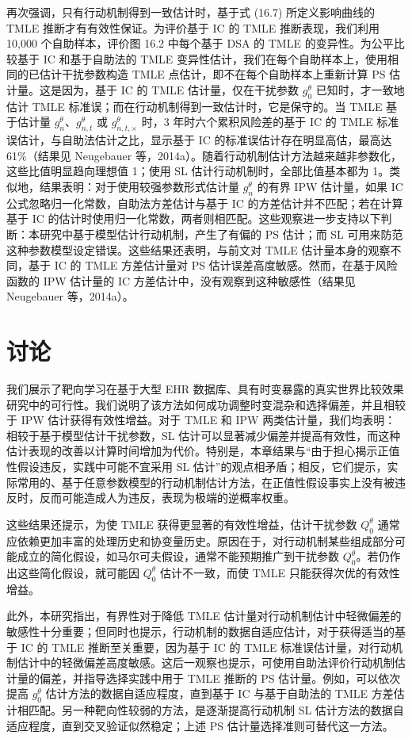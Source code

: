 再次强调，只有行动机制得到一致估计时，基于式 (16.7) 所定义影响曲线的 TMLE 推断才有有效性保证。为评价基于 IC 的 TMLE 推断表现，我们利用 10,000 个自助样本，评价图 16.2 中每个基于 DSA 的 TMLE 的变异性。为公平比较基于 IC 和基于自助法的 TMLE 变异性估计，我们在每个自助样本上，使用相同的已估计干扰参数构造 TMLE 点估计，即不在每个自助样本上重新计算 PS 估计量。这是因为，基于 IC 的 TMLE 估计量，仅在干扰参数 $g_0^\theta$ 已知时，才一致地估计 TMLE 标准误；而在行动机制得到一致估计时，它是保守的。当 TMLE 基于估计量 $g_n^\theta$、$g^\theta_{n,t}$ 或 $g^\theta_{n,t,\times}$ 时，3 年时六个累积风险差的基于 IC 的 TMLE 标准误估计，与自助法估计之比，显示基于 IC 的标准误估计存在明显高估，最高达 61\%（结果见 Neugebauer 等，2014a）。随着行动机制估计方法越来越非参数化，这些比值明显趋向理想值 1；使用 SL 估计行动机制时，全部比值基本都为 1。类似地，结果表明：对于使用较强参数形式估计量 $g_n^\theta$ 的有界 IPW 估计量，如果 IC 公式忽略归一化常数，自助法方差估计与基于 IC 的方差估计并不匹配；若在计算基于 IC 的估计时使用归一化常数，两者则相匹配。这些观察进一步支持以下判断：本研究中基于模型估计行动机制，产生了有偏的 PS 估计；而 SL 可用来防范这种参数模型设定错误。这些结果还表明，与前文对 TMLE 估计量本身的观察不同，基于 IC 的 TMLE 方差估计量对 PS 估计误差高度敏感。然而，在基于风险函数的 IPW 估计量的 IC 方差估计中，没有观察到这种敏感性（结果见 Neugebauer 等，2014a）。

\section{讨论}

我们展示了靶向学习在基于大型 EHR 数据库、具有时变暴露的真实世界比较效果研究中的可行性。我们说明了该方法如何成功调整时变混杂和选择偏差，并且相较于 IPW 估计获得有效性增益。对于 TMLE 和 IPW 两类估计量，我们均表明：相较于基于模型估计干扰参数，SL 估计可以显著减少偏差并提高有效性，而这种估计表现的改善以计算时间增加为代价。特别是，本章结果与“由于担心揭示正值性假设违反，实践中可能不宜采用 SL 估计”的观点相矛盾；相反，它们提示，实际常用的、基于任意参数模型的行动机制估计方法，在正值性假设事实上没有被违反时，反而可能造成人为违反，表现为极端的逆概率权重。

这些结果还提示，为使 TMLE 获得更显著的有效性增益，估计干扰参数 $Q_0^\theta$ 通常应依赖更加丰富的处理历史和协变量历史。原因在于，对行动机制某些组成部分可能成立的简化假设，如马尔可夫假设，通常不能预期推广到干扰参数 $Q_0^\theta$。若仍作出这些简化假设，就可能因 $Q_0^\theta$ 估计不一致，而使 TMLE 只能获得次优的有效性增益。

此外，本研究指出，有界性对于降低 TMLE 估计量对行动机制估计中轻微偏差的敏感性十分重要；但同时也提示，行动机制的数据自适应估计，对于获得适当的基于 IC 的 TMLE 推断至关重要，因为基于 IC 的 TMLE 标准误估计量，对行动机制估计中的轻微偏差高度敏感。这后一观察也提示，可使用自助法评价行动机制估计量的偏差，并指导选择实践中用于 TMLE 推断的 PS 估计量。例如，可以依次提高 $g_0^\theta$ 估计方法的数据自适应程度，直到基于 IC 与基于自助法的 TMLE 方差估计相匹配。另一种靶向性较弱的方法，是逐渐提高行动机制 SL 估计方法的数据自适应程度，直到交叉验证似然稳定；上述 PS 估计量选择准则可替代这一方法。

